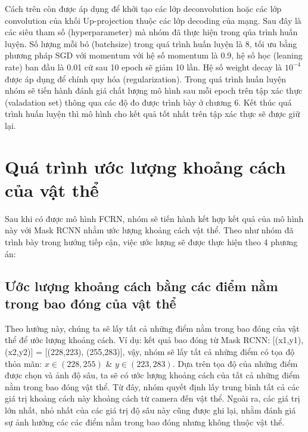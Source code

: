Cách trên còn được áp dụng để khởi tạo các lớp deconvolution hoặc các lớp convolution của khối Up-projection thuộc các lớp decoding của mạng. Sau đây là các  siêu tham số (hyperparameter) mà nhóm đã thực hiện trong qúa trình huấn luyện. Số lượng mỗi bó (batchsize) trong quá trình huấn luyện là 8, tối ưu bằng phương pháp SGD với momentum\cite{momentum} với hệ số momentum là 0.9, hệ số học (leaning rate) ban đầu là 0.01 cứ sau 10 epoch sẽ giảm 10 lần. Hệ số weight decay là $10^{-4}$ được áp dụng để chính quy hóa (regularization).
Trong quá trình huấn luyện nhóm sẽ tiến hành đánh giá chất lượng mô hình sau mỗi epoch trên tập xác thực (valadation set) thông qua các độ đo được trình bày ở chương 6. Kết thúc quá trình huấn luyện thì mô hình cho kết quả tốt nhất trên tập xác thực sẽ được giữ lại.


\section{Quá trình ước lượng khoảng cách của vật thể}

Sau khi có được mô hình FCRN, nhóm sẽ tiến hành kết hợp kết quả của mô hình này với Mask RCNN nhằm ước lượng khoảng cách vật thể. Theo như nhóm đã trình bày trong hướng tiếp cận, việc ước lượng sẽ được thực hiện theo 4 phương án:
\subsection{Ước lượng khoảng cách bằng các điểm nằm trong bao đóng của vật thể}
Theo hướng này, chúng ta sẽ lấy tất cả những điểm nằm trong bao đóng của vật thể để ước lượng khoảng cách. Ví dụ: kết quả bao đóng từ Mask RCNN: [(x1,y1), (x2,y2)] = [(228,223), (255,283)], vậy, nhóm sẽ lấy tất cả những điểm có tọa độ thỏa mãn: $x \in (228,255)$  $\&$ $y \in (223,283).$ Dựa trên tọa độ của những điểm được chọn và ảnh độ sâu, ta sẽ có ước lượng khoảng cách của tất cả những điểm nằm trong bao đóng vật thể. Từ đây, nhóm quyết định lấy trung bình tất cả các giá trị khoảng cách này khoảng cách từ camera đến vật thể. Ngoài ra, các giá trị lớn nhất, nhỏ nhất của các giá trị độ sâu này cũng được ghi lại, nhằm đánh giá sự ảnh hưởng các các điểm nằm trong bao đóng nhưng không thuộc vật thể. 

